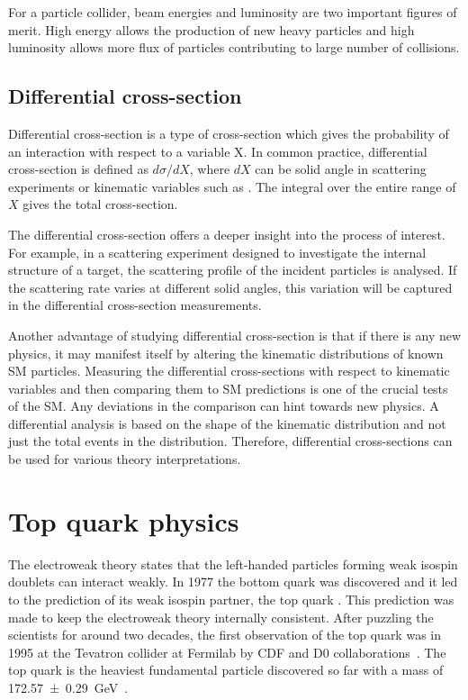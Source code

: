 For a particle collider, beam energies and luminosity are two important figures of merit. 
High energy allows the production of new heavy particles and high luminosity allows more flux 
of particles contributing to large number of collisions.

\subsection*{Differential cross-section}
Differential cross-section is a type of cross-section which gives the probability of an interaction
with respect to a variable X. In common practice, differential cross-section is defined as $d\sigma/dX$,
where $dX$ can be solid angle in scattering experiments or kinematic variables such as \pT. The 
integral over the entire range of $X$ gives the total cross-section. 

The differential cross-section offers a deeper insight into the process of interest. For example, in a 
scattering experiment designed to investigate the internal structure of a target, the scattering 
profile of the incident particles is analysed. If the scattering rate varies at different solid angles,
 this variation will be captured in the differential cross-section measurements. 

Another advantage of studying differential cross-section is that if there is any new physics,
it may manifest itself by altering the kinematic distributions of known SM particles. Measuring the 
differential cross-sections with respect to kinematic variables and then comparing them to SM predictions
is one of the crucial tests of the SM. Any deviations in the comparison can hint towards new physics.
A differential analysis is based on the shape of the kinematic distribution and not just the 
total events in the distribution. Therefore, differential cross-sections can be used for various
theory interpretations.

\section{Top quark physics}
The electroweak theory states that the left-handed particles forming weak isospin doublets can
interact weakly. In 1977 the bottom quark was discovered and it led to the prediction of its weak 
isospin partner, the top quark \Ptop. This prediction was made to keep the electroweak theory internally
consistent. After puzzling the scientists for around two decades,
the first observation of the top quark was in 1995 at the Tevatron collider at Fermilab by
CDF and D0 collaborations~\cite{PhysRevLett.74.2626,PhysRevLett.74.2632}.
The top quark is the heaviest fundamental particle discovered so far with a mass of 
\SI{172.57 \pm 0.29}{\GeV}~\cite{ParticleDataGroup:2024cfk}.

